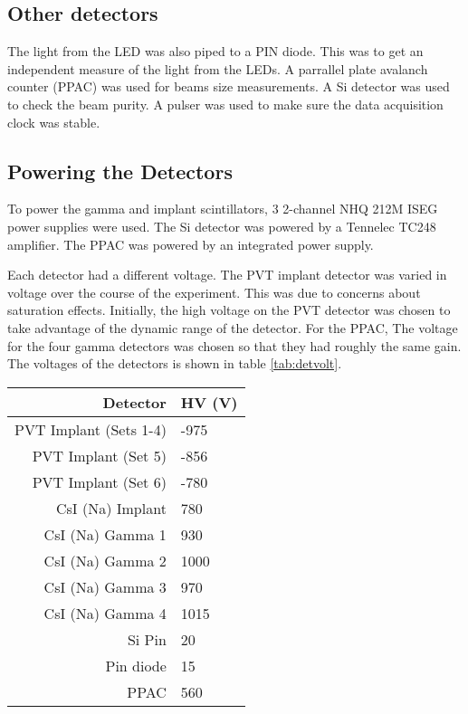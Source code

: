 \subsection{Other detectors}

The light from the LED was also piped to a PIN diode.
This was to get an independent measure of the light from the LEDs.
A parrallel plate avalanch counter (PPAC) was used for beams size measurements.
A Si detector was used to check the beam purity.
A pulser was used to make sure the data acquisition clock was stable.

\subsection{Powering the Detectors}

To power the gamma and implant scintillators, 3 2-channel NHQ 212M ISEG power supplies were used.
The Si detector was powered by a Tennelec TC248 amplifier.
The PPAC was powered by an integrated power supply.

Each detector had a different voltage. 
The PVT implant detector was varied in voltage over the course of the experiment.
This was due to concerns about saturation effects.
Initially, the high voltage on the PVT detector was chosen to take advantage of the dynamic range of the detector.
For the PPAC, 
The voltage for the four gamma detectors was chosen so that they had roughly the same gain.
The voltages of the detectors is shown in table \ref{tab:detvolt}.

\begin{center}
	\begin{tabular}{r|l}
	Detector & HV (V) \\ \hline
	PVT Implant (Sets 1-4) & -975 \\
	PVT Implant (Set 5) & -856 \\
	PVT Implant (Set 6) & -780 \\
	CsI (Na) Implant & 780 \\ 
	CsI (Na) Gamma 1 & 930 \\
	CsI (Na) Gamma 2 & 1000 \\
	CsI (Na) Gamma 3 & 970 \\
	CsI (Na) Gamma 4 & 1015 \\
	Si Pin & 20 \\
	Pin diode & 15 \\
	PPAC & 560 
	\label{tab:detvolt}
	\end{tabular}
\end{center}

